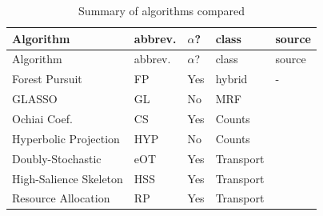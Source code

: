 \documentclass[%
	12pt,
		oneside,
		letterpaper
]{book}
\begin{document}
\begin{longtable}[]{@{}
  >{\raggedright\arraybackslash}p{}
  >{\centering\arraybackslash}p{}
  >{\centering\arraybackslash}p{}
  >{\centering\arraybackslash}p{}
  >{\raggedleft\arraybackslash}p{}@{}}
\caption{Summary of algorithms
compared}\label{tbl-methods}\tabularnewline
\toprule\noalign{}
\begin{minipage}[b]{\linewidth}\raggedright
Algorithm
\end{minipage} & \begin{minipage}[b]{\linewidth}\centering
abbrev.
\end{minipage} & \begin{minipage}[b]{\linewidth}\centering
\(\alpha\)?
\end{minipage} & \begin{minipage}[b]{\linewidth}\centering
class
\end{minipage} & \begin{minipage}[b]{\linewidth}\raggedleft
source
\end{minipage} \\
\midrule\noalign{}
\endfirsthead
\toprule\noalign{}
\begin{minipage}[b]{\linewidth}\raggedright
Algorithm
\end{minipage} & \begin{minipage}[b]{\linewidth}\centering
abbrev.
\end{minipage} & \begin{minipage}[b]{\linewidth}\centering
\(\alpha\)?
\end{minipage} & \begin{minipage}[b]{\linewidth}\centering
class
\end{minipage} & \begin{minipage}[b]{\linewidth}\raggedleft
source
\end{minipage} \\
\midrule\noalign{}
\endhead
\bottomrule\noalign{}
\endlastfoot
Forest Pursuit & FP & Yes & hybrid & - \\
GLASSO & GL & No & MRF &
\autocite{Sparseinversecovariance_Friedman2008,Structureestimationdiscrete_Loh2012} \\
Ochiai Coef. & CS & Yes & Counts &
\autocite{Measuresecologicalassociation_Janson1981} \\
Hyperbolic Projection & HYP & No & Counts &
\autocite{Scientificcollaborationnetworks._Newman2001} \\
Doubly-Stochastic & eOT & Yes & Transport &
\autocite{twostagealgorithm_Slater2009,Sinkhorndistanceslightspeed_Cuturi2013} \\
High-Salience Skeleton & HSS & Yes & Transport &
\autocite{Robustclassificationsalient_Grady2012} \\
Resource Allocation & RP & Yes & Transport &
\autocite{Bipartitenetworkprojection_Zhou2007} \\
\end{longtable}
\end{document}
